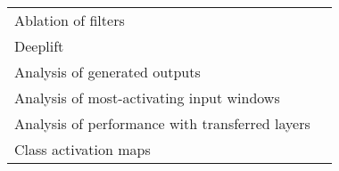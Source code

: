 \begin{tabular}{ll}
Ablation of filters                                    &                                                                                                                                                                                \cite{Lawhern2018} \\
Deeplift                                               &                                                                                                                                                                                \cite{Lawhern2018} \\
Analysis of generated outputs                          &                                                                                                                                                                               \cite{Hartmann2018} \\
Analysis of most-activating input windows              &                                                                                                                                                                              \cite{Hartmann2018b} \\
Analysis of performance with transferred layers        &                                                                                                                                                                            \cite{Hajinoroozi2017} \\
Class activation maps                                  &                                                                                                                                                                                  \cite{Ghosh2018} \\
\bottomrule
\end{tabular}
